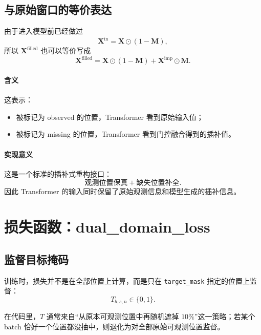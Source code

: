 \documentclass[UTF8]{ctexart}
\begin{document}
\subsection{与原始窗口的等价表达}

由于进入模型前已经做过
\begin{equation}
    \bm{X}^{\text{in}} = \bm{X} \odot (1-\bm{M}),
\end{equation}
所以 $\bm{X}^{\text{filled}}$ 也可以等价写成
\begin{equation}
    \bm{X}^{\text{filled}}
    =
    \bm{X} \odot (1-\bm{M})
    +
    \bm{X}^{\text{imp}} \odot \bm{M}.
\end{equation}

\paragraph{含义}
这表示：
\begin{itemize}
    \item 被标记为 observed 的位置，Transformer 看到原始输入值；
    \item 被标记为 missing 的位置，Transformer 看到门控融合得到的插补值。
\end{itemize}

\paragraph{实现意义}
这是一个标准的插补式重构接口：
\begin{equation}
    \text{观测位置保真} + \text{缺失位置补全}.
\end{equation}
因此 Transformer 的输入同时保留了原始观测信息和模型生成的插补信息。

\section{损失函数：dual\_domain\_loss}

\subsection{监督目标掩码}

训练时，损失并不是在全部位置上计算，而是只在 \texttt{target\_mask} 指定的位置上监督：
\begin{equation}
    T_{b,s,n} \in \{0,1\}.
\end{equation}

在代码里，$T$ 通常来自“从原本可观测位置中再随机遮掉 $10\%$”这一策略；若某个 batch 恰好一个位置都没抽中，则退化为对全部原始可观测位置监督。
\end{document}
